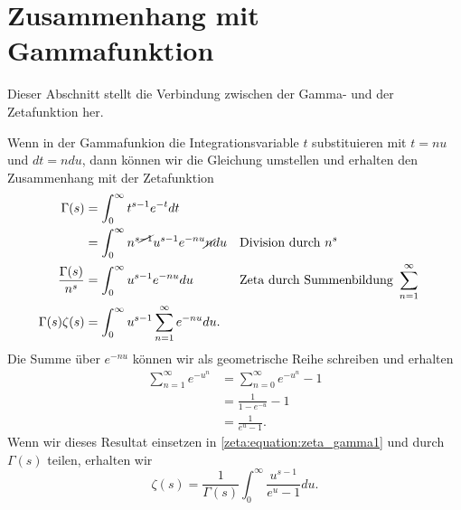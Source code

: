 \section{Zusammenhang mit Gammafunktion} \label{zeta:section:zusammenhang_mit_gammafunktion}

Dieser Abschnitt stellt die Verbindung zwischen der Gamma- und der Zetafunktion her.

Wenn in der Gammafunkion die Integrationsvariable $t$ substituieren mit $t = nu$ und $dt = n du$, dann können wir die Gleichung umstellen und erhalten den Zusammenhang mit der Zetafunktion
\begin{align}
    \Gamma(s)
    &=
    \int_0^{\infty} t^{s-1} e^{-t} dt
    \\
    &=
    \int_0^{\infty} n^{s\cancel{-1}}u^{s-1} e^{-nu} \cancel{n}du
    &&
    \text{Division durch }n^s
    \\
    \frac{\Gamma(s)}{n^s}
    &=
    \int_0^{\infty} u^{s-1} e^{-nu}du
    &&
    \text{Zeta durch Summenbildung } \sum_{n=1}^{\infty}
    \\
    \Gamma(s) \zeta(s)
    &=
    \int_0^{\infty} u^{s-1}
    \sum_{n=1}^{\infty}e^{-nu}
    du.
    \label{zeta:equation:zeta_gamma1}
\end{align}
Die Summe über $e^{-nu}$ können wir als geometrische Reihe schreiben und erhalten
\begin{align}
    \sum_{n=1}^{\infty}e^{-u^n}
    &=
    \sum_{n=0}^{\infty}e^{-u^n}
    -
    1
    \\
    &=
    \frac{1}{1 - e^{-u}} - 1
    \\
    &=
    \frac{1}{e^u - 1}.
\end{align}
Wenn wir dieses Resultat einsetzen in \eqref{zeta:equation:zeta_gamma1} und durch $\Gamma(s)$ teilen, erhalten wir
\begin{equation}\label{zeta:equation:zeta_gamma_final}
    \zeta(s)
    =
    \frac{1}{\Gamma(s)}
    \int_0^{\infty}
    \frac{u^{s-1}}{e^u -1}
    du.
\end{equation}
